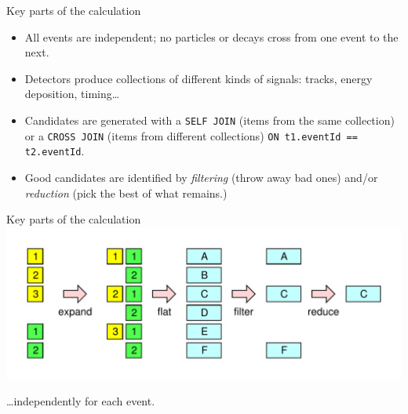 \documentclass[aspectratio=169]{beamer}
\begin{document}
\begin{frame}{Key parts of the calculation}
\Large
\vspace{0.15 cm}
\begin{itemize}\setlength{\itemsep}{0.25 cm}
\item All events are independent; no particles or decays cross from one event to the next.
\item Detectors produce collections of different kinds of signals: tracks, energy deposition, timing\ldots
\item Candidates are generated with a \texttt{SELF JOIN} (items from the same collection) or a \texttt{CROSS JOIN} (items from different collections) \texttt{ON t1.eventId == t2.eventId}.
\item Good candidates are identified by {\it filtering} (throw away bad ones) and/or {\it reduction} (pick the best of what remains.)
\end{itemize}
\end{frame}

\begin{frame}{Key parts of the calculation}
\Large
\vspace{0.5 cm}
\includegraphics[width=\linewidth]{explode-flat-reduce.pdf}

\hfill \ldots independently for each event.
\end{frame}
\end{document}
